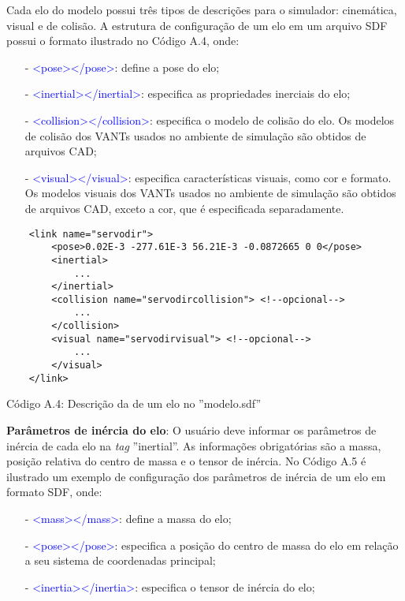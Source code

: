 Cada elo do modelo possui três tipos de descrições para o simulador: cinemática, visual e de colisão.  A estrutura de configuração de um elo em um arquivo SDF possui o formato ilustrado no Código A.4, onde:
\small
\begin{itemize}
\setlength{\itemsep}{1pt}
\setlength{\parskip}{0pt}
\setlength{\parsep}{0pt}
\item[-] \textcolor{blue}{<pose></pose>}: define a pose do elo;
\item[-] \textcolor{blue}{<inertial></inertial>}: especifica as propriedades inerciais do elo;
\item[-] \textcolor{blue}{<collision></collision>}: especifica o modelo de colisão do elo. Os modelos de colisão dos VANTs usados no ambiente de simulação são obtidos de arquivos CAD;
\item[-] \textcolor{blue}{<visual></visual>}: especifica características visuais, como cor e formato. Os modelos visuais dos VANTs usados no ambiente de simulação são obtidos de arquivos CAD, exceto a cor, que é especificada separadamente.
\end{itemize}\normalsize

	\begin{verbatim}
	<link name="servodir">
		<pose>0.02E-3 -277.61E-3 56.21E-3 -0.0872665 0 0</pose>
		<inertial> 
			...
		</inertial>
		<collision name="servodircollision"> <!--opcional-->
			...
		</collision>
		<visual name="servodirvisual"> <!--opcional-->
			...
		</visual>
	</link>
	\end{verbatim}
	\centerline{Código A.4: Descrição da de um elo no ''modelo.sdf''} 
	
	\vspace{1cm}
	


\noindent \textbf{Parâmetros de inércia do elo}: O usuário deve informar os parâmetros de inércia de cada elo na \textit{tag} ''inertial''. As informações obrigatórias são a massa, posição relativa do centro de massa e o tensor de inércia. No Código A.5 é ilustrado um exemplo de configuração dos parâmetros de inércia de um elo em formato SDF, onde:
\small
\begin{itemize}
\setlength{\itemsep}{1pt}
\setlength{\parskip}{0pt}
\setlength{\parsep}{0pt}
\item[-] \textcolor{blue}{<mass></mass>}: define a massa do elo;
\item[-] \textcolor{blue}{<pose></pose>}: especifica a posição do centro de massa do elo em relação a seu sistema de coordenadas principal;
\item[-] \textcolor{blue}{<inertia></inertia>}: especifica o tensor de inércia do elo;
\end{itemize}\normalsize



